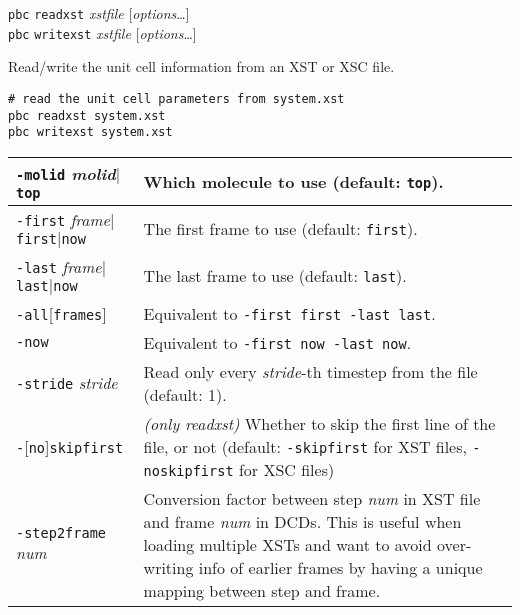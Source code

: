 \documentclass[a4paper, DIV12]{scrartcl}
\begin{document}
\texttt{pbc} \texttt{readxst} \textit{xstfile} [\textit{options}\dots]\\
\texttt{pbc} \texttt{writexst} \textit{xstfile} [\textit{options}\dots]

Read/write the unit cell information from an XST or XSC file.

\begin{Verbatim}
# read the unit cell parameters from system.xst
pbc readxst system.xst
pbc writexst system.xst
\end{Verbatim}


\begin{tabular}{|p{}|p{}|}
\hline

\texttt{-molid} \textit{molid}$|$\texttt{top}
& Which molecule to use (default: \texttt{top}).
\\ \hline

\texttt{-first} \textit{frame}$|$\texttt{first}$|$\texttt{now}
& The first frame to use (default: \texttt{first}).
\\ \hline

\texttt{-last} \textit{frame}$|$\texttt{last}$|$\texttt{now}
& The last frame to use (default: \texttt{last}).
\\ \hline

\texttt{-all}[\texttt{frames}]
& Equivalent to \texttt{-first first -last last}.
\\ \hline

\texttt{-now}
& Equivalent to \texttt{-first now -last now}.
\\ \hline

\texttt{-stride} \textit{stride}
& Read only every \textit{stride}-th timestep from the
file (default: 1).
\\ \hline

\texttt{-}[\texttt{no}]\texttt{skipfirst}
& \emph{(only readxst)} Whether to skip the first line of the file, or not
(default: \texttt{-skipfirst} for XST files, \texttt{-noskipfirst} for
XSC files)
\\ \hline

\texttt{-step2frame} \textit{num}
& Conversion factor between step \textit{num} in XST file
and frame \textit{num} in DCDs. This is useful when loading multiple
XSTs and want to avoid over-writing info of earlier frames
by having a unique mapping between step and frame.
\\ \hline


\end{tabular}
\end{document}
